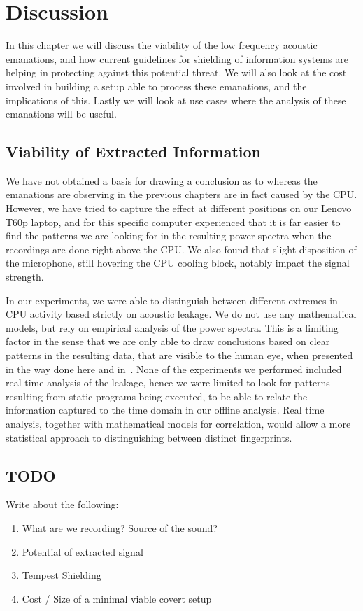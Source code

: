 \chapter{Discussion}\label{chp6:discussion}

In this chapter we will discuss the viability of the low frequency acoustic emanations, and how current guidelines for shielding of information systems are helping in protecting against this potential threat.
We will also look at the cost involved in building a setup able to process these emanations, and the implications of this.
Lastly we will look at use cases where the analysis of these emanations will be useful.

\section{Viability of Extracted Information}
We have not obtained a basis for drawing a conclusion as to whereas the emanations are observing in the previous chapters are in fact caused by the CPU.
However, we have tried to capture the effect at different positions on our Lenovo T60p laptop, and for this specific computer experienced that it is far easier to find the patterns we are looking for in the resulting power spectra when the recordings are done right above the CPU.
We also found that slight disposition of the microphone, still hovering the CPU cooling block, notably impact the signal strength.

In our experiments, we were able to distinguish between different extremes in CPU activity based strictly on acoustic leakage. 
We do not use any mathematical models, but rely on empirical analysis of the power spectra. 
This is a limiting factor in the sense that we are only able to draw conclusions based on clear patterns in the resulting data, that are visible to the human eye, when presented in the way done here and in~\cite{DBLP:conf/crypto/GenkinST14}.
None of the experiments we performed included real time analysis of the leakage, hence we were limited to look for patterns resulting from static programs being executed, to be able to relate the information captured to the time domain in our offline analysis.
Real time analysis, together with mathematical models for correlation, would allow a more statistical approach to distinguishing between distinct fingerprints.

\section{TODO}
Write about the following:
\begin{enumerate}
	\item What are we recording? Source of the sound?
	\item Potential of extracted signal
	\item Tempest Shielding
	\item Cost / Size of a minimal viable covert setup
\end{enumerate}


